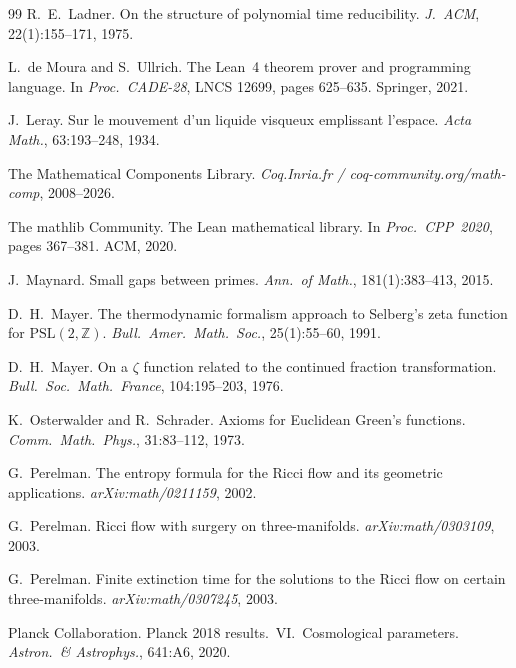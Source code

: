 \documentclass[11pt,a4paper]{article}
\theoremstyle{definition}
\theoremstyle{remark}
\begin{document}
\begin{thebibliography}{99}
R.\ E.\ Ladner.
\newblock On the structure of polynomial time reducibility.
\newblock \emph{J.\ ACM}, 22(1):155--171, 1975.

L.\ de Moura and S.\ Ullrich.
\newblock The Lean~4 theorem prover and programming language.
\newblock In \emph{Proc.\ CADE-28}, LNCS 12699, pages 625--635.
Springer, 2021.

J.\ Leray.
\newblock Sur le mouvement d'un liquide visqueux emplissant l'espace.
\newblock \emph{Acta Math.}, 63:193--248, 1934.

The Mathematical Components Library.
\newblock \emph{Coq.Inria.fr / coq-community.org/math-comp},
2008--2026.

The mathlib Community.
\newblock The Lean mathematical library.
\newblock In \emph{Proc.\ CPP~2020}, pages 367--381. ACM, 2020.

J.\ Maynard.
\newblock Small gaps between primes.
\newblock \emph{Ann.\ of Math.}, 181(1):383--413, 2015.

D.\ H.\ Mayer.
\newblock The thermodynamic formalism approach to Selberg's zeta
function for $\mathrm{PSL}(2,\mathbb{Z})$.
\newblock \emph{Bull.\ Amer.\ Math.\ Soc.}, 25(1):55--60, 1991.

D.\ H.\ Mayer.
\newblock On a $\zeta$ function related to the continued fraction
transformation.
\newblock \emph{Bull.\ Soc.\ Math.\ France}, 104:195--203, 1976.

K.\ Osterwalder and R.\ Schrader.
\newblock Axioms for Euclidean Green's functions.
\newblock \emph{Comm.\ Math.\ Phys.}, 31:83--112, 1973.

G.\ Perelman.
\newblock The entropy formula for the Ricci flow and its geometric
applications.
\newblock \emph{arXiv:math/0211159}, 2002.

G.\ Perelman.
\newblock Ricci flow with surgery on three-manifolds.
\newblock \emph{arXiv:math/0303109}, 2003.

G.\ Perelman.
\newblock Finite extinction time for the solutions to the Ricci
flow on certain three-manifolds.
\newblock \emph{arXiv:math/0307245}, 2003.

Planck Collaboration.
\newblock Planck 2018 results.\ VI.\ Cosmological parameters.
\newblock \emph{Astron.\ \& Astrophys.}, 641:A6, 2020.


\end{thebibliography}
\end{document}
